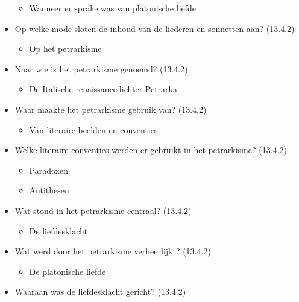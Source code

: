 \begin{itemize}
  \begin{itemize}
  \itemsep1pt\parskip0pt
  \item
    Wanneer er sprake was van platonische liefde
  \end{itemize}
\item
  Op welke mode sloten de inhoud van de liederen en sonnetten aan?
  (13.4.2)

  \begin{itemize}
  \itemsep1pt\parskip0pt
  \item
    Op het petrarkisme
  \end{itemize}
\item
  Naar wie is het petrarkisme genoemd? (13.4.2)

  \begin{itemize}
  \itemsep1pt\parskip0pt
  \item
    De Italische renaissancedichter Petrarka
  \end{itemize}
\item
  Waar maakte het petrarkisme gebruik van? (13.4.2)

  \begin{itemize}
  \itemsep1pt\parskip0pt
  \item
    Van literaire beelden en conventies
  \end{itemize}
\item
  Welke literaire conventies werden er gebruikt in het petrarkisme?
  (13.4.2)

  \begin{itemize}
  \itemsep1pt\parskip0pt
  \item
    Paradoxen
  \item
    Antithesen
  \end{itemize}
\item
  Wat stond in het petrarkisme centraal? (13.4.2)

  \begin{itemize}
  \itemsep1pt\parskip0pt
  \item
    De liefdesklacht
  \end{itemize}
\item
  Wat werd door het petrarkisme verheerlijkt? (13.4.2)

  \begin{itemize}
  \itemsep1pt\parskip0pt
  \item
    De platonische liefde
  \end{itemize}
\item
  Waaraan was de liefdesklacht gericht? (13.4.2)


\end{itemize}

